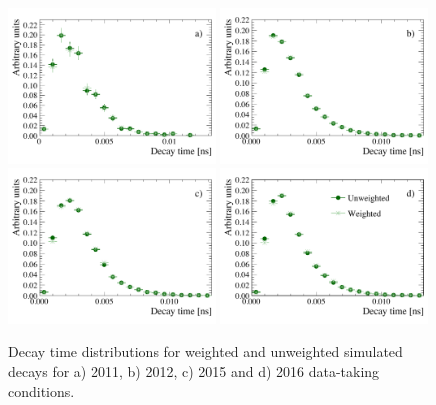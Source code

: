 \begin{figure}[tbp]
  \centering
    \includegraphics[width=0.49\textwidth]{./Figs/LifetimeMeasurement/2011_decaytime_Bd2KPi_weighting_impact.pdf}
    \includegraphics[width=0.49\textwidth]{./Figs/LifetimeMeasurement/2012_decaytime_Bd2KPi_weighting_impact.pdf}
    \includegraphics[width=0.49\textwidth]{./Figs/LifetimeMeasurement/2015_decaytime_Bd2KPi_weighting_impact.pdf}
    \includegraphics[width=0.49\textwidth]{./Figs/LifetimeMeasurement/2016_decaytime_Bd2KPi_weighting_impact.pdf}
  \caption{Decay time distributions for weighted and unweighted \bdkpi simulated decays for a) 2011, b) 2012, c) 2015 and d) 2016 data-taking conditions.}%
  \label{fig:BdToKpi_weightDecayTime}
\end{figure}
